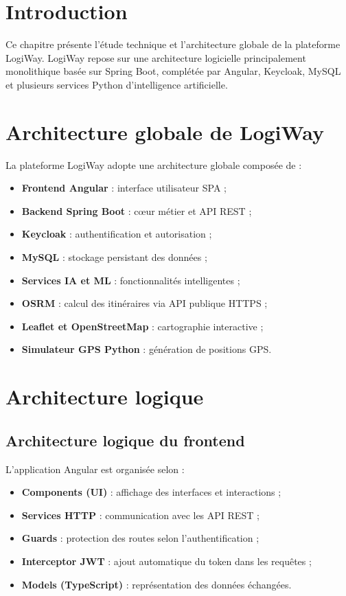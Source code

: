 \documentclass[12pt,a4paper]{report}
\begin{document}
\section{Introduction}
\label{sec:ch2-introduction}

Ce chapitre présente l'étude technique et l'architecture globale de la
plateforme LogiWay. LogiWay repose sur une architecture logicielle
principalement monolithique basée sur Spring Boot, complétée par Angular,
Keycloak, MySQL et plusieurs services Python d'intelligence artificielle.

\section{Architecture globale de LogiWay}
\label{sec:ch2-archi-globale}

La plateforme LogiWay adopte une architecture globale composée de :
\begin{itemize}
    \item \textbf{Frontend Angular} : interface utilisateur SPA ;
    \item \textbf{Backend Spring Boot} : c\oe{}ur métier et API REST ;
    \item \textbf{Keycloak} : authentification et autorisation ;
    \item \textbf{MySQL} : stockage persistant des données ;
    \item \textbf{Services IA et ML} : fonctionnalités intelligentes ;
    \item \textbf{OSRM} : calcul des itinéraires via API publique HTTPS ;
    \item \textbf{Leaflet et OpenStreetMap} : cartographie interactive ;
    \item \textbf{Simulateur GPS Python} : génération de positions GPS.
\end{itemize}

\section{Architecture logique}
\label{sec:ch2-archi-logique}

\subsection{Architecture logique du frontend}

L'application Angular est organisée selon :
\begin{itemize}
    \item \textbf{Components (UI)} : affichage des interfaces et interactions ;
    \item \textbf{Services HTTP} : communication avec les API REST ;
    \item \textbf{Guards} : protection des routes selon l'authentification ;
    \item \textbf{Interceptor JWT} : ajout automatique du token dans les requêtes ;
    \item \textbf{Models (TypeScript)} : représentation des données échangées.
\end{itemize}
\end{document}
